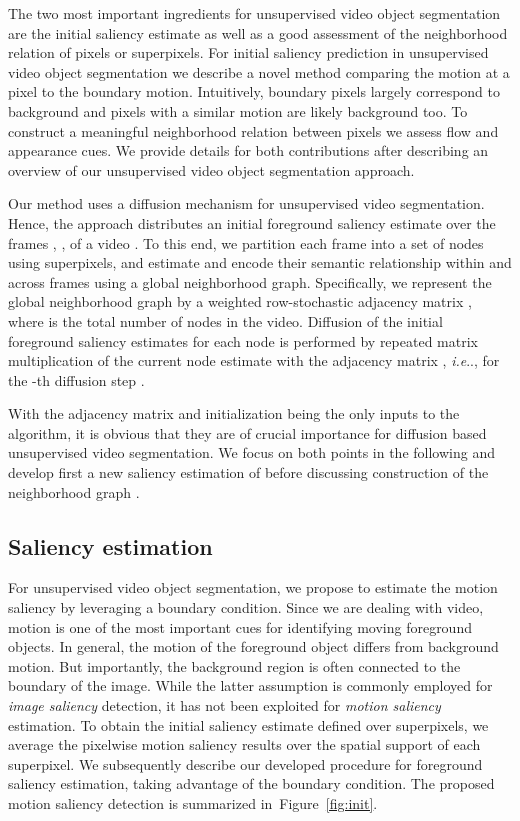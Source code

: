 \documentclass[runningheads]{llncs}
\makeatletter
\newcommand\para[1]{\noindent{#1}}
\def\@onedot{\ifx\@let@token.\else.\null\fi\xspace}
\DeclareRobustCommand\onedot{\futurelet\@let@token\@onedot}
\newcommand{\figref}[1]{Figure~\ref{#1}}
\def\ie{\emph{i.e}\onedot} \def\Ie{\emph{I.e}\onedot}
\makeatother
\begin{document}
The two most important ingredients for unsupervised video object segmentation are the initial saliency estimate as well as a good assessment of the neighborhood relation of pixels or superpixels. For initial saliency prediction in unsupervised video object segmentation we describe a novel method comparing the motion  at a pixel to the boundary motion. Intuitively, boundary pixels largely correspond to background and pixels with a similar motion are likely background too. To construct a meaningful neighborhood relation between pixels we assess flow and appearance cues. We provide details for both contributions after describing an overview of our unsupervised video object segmentation approach. 

\para{\bf Method overview:} 
Our method uses a diffusion mechanism for unsupervised video segmentation. Hence, the approach distributes an initial foreground saliency estimate over the  frames , , of a video . To this end, we partition each frame into a set of nodes using superpixels, and estimate and encode their semantic relationship within and across frames using a global neighborhood graph. Specifically, we represent the global neighborhood graph by a weighted row-stochastic adjacency matrix , where  is the total number of nodes in the video. Diffusion of the initial foreground saliency estimates  for each node is performed by repeated matrix multiplication of the current node estimate with the adjacency matrix , \ie,   for the -th diffusion step .

With the adjacency matrix  and initialization  being the only inputs to the algorithm, it is obvious that they are of crucial importance for diffusion based unsupervised video segmentation. We focus on both points in the following and develop first a new saliency estimation of  before discussing  construction of the neighborhood graph .

\subsection{Saliency estimation}
\label{sec:init}
For unsupervised video object segmentation, we propose to estimate the motion saliency by leveraging a boundary condition. Since we are dealing with video, motion is one of the most important cues for identifying moving foreground objects. In general, the motion of the foreground object differs from background motion. But importantly, the background region is often connected to the boundary of the image. While the latter assumption is commonly employed for \emph{image saliency} detection, it has not been exploited for \emph{motion saliency} estimation. 
To obtain the initial saliency estimate  defined over superpixels, we average the pixelwise motion saliency results  over the spatial support of each superpixel. We subsequently describe our developed procedure for foreground saliency estimation, taking advantage of the boundary condition. The proposed motion saliency detection is summarized in~\figref{fig:init}.
\end{document}
